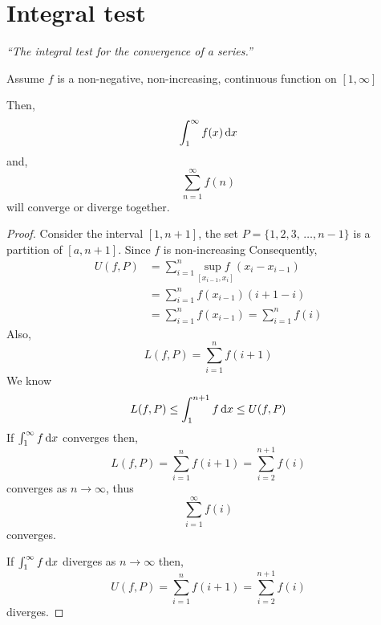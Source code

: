 \documentclass[12pt]{report}
\begin{document}
    \section{Integral test}
    \textit{``The integral test for the convergence of a series.''} \vspace{3mm}
    \begin{theorem}
        Assume \(f\) is a non-negative, non-increasing, continuous function on \([1,\infty]\)

        Then,
        \[\int^\infty_1 f(x) \, \mathrm{d} x\]
        and,
        \[\sum^\infty_{n=1} f(n)\]
        will converge or diverge together.
    \end{theorem}
    \begin{proof}
        Consider the interval \([1,n+1]\), the set \(P = \{1,2,3, \, \dots, n -1\}\) is a partition of \([a,n+1]\). Since \(f\) is non-increasing
        \sidebyside{\[\underset{[x_{i-1}, x_i]}{\inf f } = f(x_i)\]}{\[\underset{[x_{i-1}, x_i]}{\sup f} = f(x_{i-1})\]}
        Consequently,
        \begin{align*}
            U(f,P) &= \sum^n_{i=1} \underset{[x_{i-1}, x_i]}{\sup f} ( x_i - x_{i-1} )\\
            &= \sum^n_{i=1} f(x_{i-1})(i+1-i)\\
            &= \sum^n_{i=1} f(x_{i-1}) = \sum^n_{i=1} f(i)
        \end{align*}
        Also,
        \[L(f,P) = \sum^n_{i=1} f(i+1)\]
        We know 
        \[L(f,P) \leq  \int^{n+1}_1 f \, \mathrm{d} x \leq U(f,P)\]
        If \(\int^\infty_1 f \, \mathrm{d} x\) converges then,
        \[L(f,P)= \sum^n_{i=1} f(i+1)= \sum^{n+1}_{i=2} f(i)\]
        converges as \(n \to \infty\), thus
        \[\sum^\infty_{i=1} f(i)\]
        converges.
        
        If \(\int^\infty_1 f \, \mathrm{d} x\) diverges as \(n \to \infty\) then,
        \[U(f,P)= \sum^n_{i=1} f(i+1)= \sum^{n+1}_{i=2} f(i)\]
        diverges.
    \end{proof}
\end{document}
